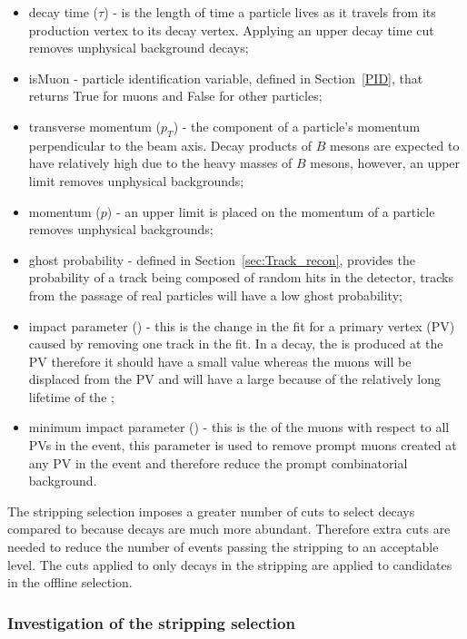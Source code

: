 \begin{itemize}
\item decay time ($\tau$) - is the length of time a particle lives as it travels from its production vertex to its decay vertex. Applying an upper decay time cut removes unphysical background decays;
\item isMuon - particle identification variable, defined in Section~\ref{PID}, that returns True for muons and False for other particles;
\item transverse momentum ($p_{T}$) - the component of a particle's momentum perpendicular to the beam axis. Decay products of $B$ mesons are expected to have relatively high \pt due to the heavy masses of $B$ mesons, however, an upper limit removes unphysical backgrounds;
\item momentum ($p$) - an upper limit is placed on the momentum of a particle  removes unphysical backgrounds;
\item ghost probability - defined in Section~\ref{sec:Track_recon}, provides the probability of a track being composed of random hits in the detector, tracks from the passage of real particles will have a low ghost probability; 
\item impact parameter \chisqd (\chiIP) - this is the change in the fit \chisqd for a primary vertex (PV) caused by removing one track in the fit. In a \bsmumu decay, the \bsd is produced at the PV therefore it should have a small \chiIP value whereas the muons will be displaced from the PV and will have a large \chiIP because of the relatively long lifetime of the \bsd;
\item minimum impact parameter (\chiIP) - this is the \chiIP  of the muons with respect to all PVs in the event, this parameter is used to remove prompt muons created at any PV in the event and therefore reduce the prompt combinatorial background. 
\end{itemize}

The stripping selection imposes a greater number of cuts to select \bhh decays compared to \bsmumu because \bhh decays are much more abundant. Therefore extra cuts are needed to reduce the number of events passing the stripping to an acceptable level. The cuts applied to only \bhh decays in the stripping are applied to \bsmumu candidates in the offline selection. %


\subsubsection{Investigation of the stripping selection}
\label{strippingstudies}


